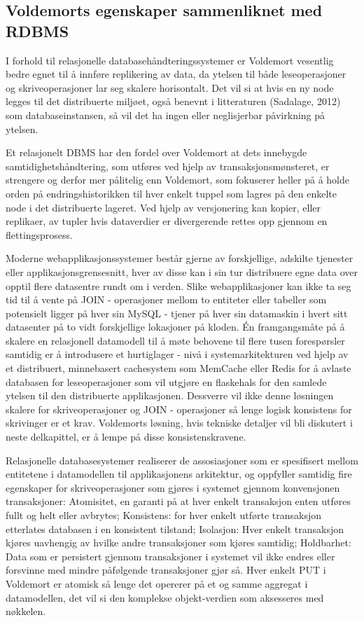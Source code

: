 \subsection{Voldemorts egenskaper sammenliknet med RDBMS}
I forhold til relasjonelle databasehåndteringssystemer er Voldemort vesentlig bedre egnet til å innføre replikering av data, da ytelsen til både leseoperasjoner og skriveoperasjoner lar seg skalere horisontalt. Det vil si at hvis en ny node legges til det distribuerte miljøet, også benevnt i litteraturen (Sadalage, 2012) som databaseinstansen, så vil det ha ingen eller neglisjerbar påvirkning på ytelsen. 

Et relasjonelt DBMS har den fordel over Voldemort at dets innebygde samtidighetshåndtering, som utføres ved hjelp av transaksjonsmønsteret, er strengere og derfor mer pålitelig enn Voldemort, som fokuserer heller på å holde orden på endringshistorikken til hver enkelt tuppel som lagres på den enkelte node i det distribuerte lageret. Ved hjelp av versjonering kan kopier, eller replikaer, av tupler hvis dataverdier er divergerende rettes opp gjennom en flettingsprosess.

Moderne webapplikasjonssystemer består gjerne av forskjellige, adskilte tjenester eller applikasjonsgrensesnitt, hver av disse kan i sin tur distribuere egne data over opptil flere datasentre rundt om i verden. Slike webapplikasjoner kan ikke ta seg tid til å vente på JOIN - operasjoner mellom to entiteter eller tabeller som potensielt ligger på hver sin MySQL - tjener på hver sin datamaskin i hvert sitt datasenter på to vidt forskjellige lokasjoner på kloden. Én framgangsmåte på å skalere en relasjonell datamodell til å møte behovene til flere tusen forespørsler samtidig er å introdusere et hurtiglager - nivå i systemarkitekturen ved hjelp av et distribuert, minnebasert cachesystem som MemCache eller Redis for å avlaste databasen for leseoperasjoner som vil utgjøre en flaskehals for den samlede ytelsen til den distribuerte applikasjonen. Dessverre vil ikke denne løsningen skalere for skriveoperasjoner og JOIN - operasjoner så lenge logisk konsistens for skrivinger er et krav. Voldemorts løsning, hvis tekniske detaljer vil bli diskutert i neste delkapittel, er å lempe på disse konsistenskravene.

Relasjonelle databasesystemer realiserer de assosiasjoner som er spesifisert mellom entitetene i datamodellen til applikasjonens arkitektur, og oppfyller samtidig fire egenskaper for skriveoperasjoner som gjøres i systemet gjennom konvensjonen transaksjoner: Atomisitet, en garanti på at hver enkelt transaksjon enten utføres fullt og helt eller avbrytes; Konsistens: for hver enkelt utførte transaksjon etterlates databasen i en konsistent tilstand; Isolasjon: Hver enkelt transaksjon kjøres uavhengig av hvilke andre transaksjoner som kjøres samtidig; Holdbarhet: Data som er persistert gjennom transaksjoner i systemet vil ikke endres eller forsvinne med mindre påfølgende transaksjoner gjør så. Hver enkelt PUT i Voldemort er atomisk så lenge det opererer på et og samme aggregat i datamodellen, det vil si den komplekse objekt-verdien som aksesseres med nøkkelen.

